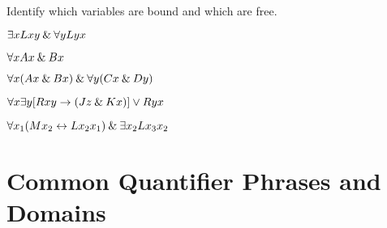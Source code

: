 \practiceproblems
\problempart
\label{pr.freeFOL}
Identify which variables are bound and which are free.
\begin{earg}
\item $\exists x Lxy \mathbin{\&} \forall y Lyx$
\item $\forall x Ax \mathbin{\&} Bx$
\item $\forall x (Ax \mathbin{\&} Bx) \mathbin{\&} \forall y(Cx \mathbin{\&} Dy)$
\item $\forall x\exists y[Rxy \rightarrow (Jz \mathbin{\&} Kx)] \vee Ryx$
\item $\forall x_1(Mx_2 \leftrightarrow Lx_2x_1) \mathbin{\&} \exists x_2 Lx_3x_2$
\end{earg}



\chapter{Common Quantifier Phrases and Domains}
\label{s:SymbolisingSimpleFOL}


